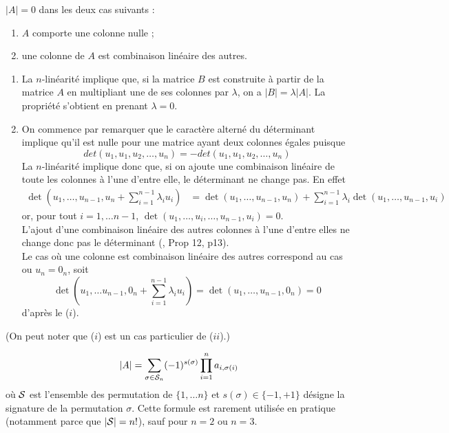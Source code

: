 \begin{lemma} \label{lem:determinantNul}
  $|A| = 0$ dans les deux cas suivants :
  \begin{enumerate}[($i$)] 
  \item $A$ comporte une colonne nulle ;
  \item une colonne de $A$ est combinaison linéaire des autres.
  \end{enumerate}
\end{lemma}

\begin{enumerate}[($i$)]
\item La $n$-linéarité implique que, si la matrice $B$ est construite à partir de la matrice $A$ en multipliant une de ses colonnes par $\lambda$, on a $|B| = \lambda |A|$. La propriété s'obtient en prenant $\lambda = 0$.
\item On commence par remarquer que le caractère alterné du déterminant implique qu'il est nulle pour une matrice ayant deux colonnes égales puisque
$$
det(u_1, u_1, u_2,\dots, u_n) = -det(u_1, u_1, u_2,\dots, u_n)
$$
La $n$-linéarité implique donc que, si on ajoute une combinaison linéaire de toute les colonnes à l'une d'entre elle, le déterminant ne change pas. En effet
\begin{align*}
  \det\left(u_1, \dots, u_{n-1}, u_n + \sum_{i=1}^{n-1} \lambda_i u_i\right)
  & = \det\left(u_1, \dots, u_{n-1}, u_n\right)
  + \sum_{i=1}^{n-1} \lambda_i \det\left(u_1, \dots, u_{n-1}, u_i\right)
\end{align*}
or, pour tout $i = 1, \dots n-1$, $ \det\left(u_1, \dots, u_i, \dots, u_{n-1}, u_i\right) = 0$. \\
L'ajout d'une combinaison linéaire des autres colonnes à l'une d'entre elles ne change donc pas le déterminant (\cite{GAJ94}, Prop 12, p13). \\
Le cas où une colonne est combinaison linéaire des autres correspond au cas ou $u_n = 0_n$, soit
$$
\det\left(u_1, \dots u_{n-1}, 0_n + \sum_{i=1}^{n-1} \lambda_i u_i\right)
= \det\left(u_1, \dots, u_{n-1}, 0_n\right)
= 0
$$
d'après le ($i$).
\end{enumerate}
(On peut noter que ($i$) est un cas particulier de ($ii$).)
\eproof

\begin{proposition} \label{prop:formuleGeneraleDeterminant}
  \begin{equation} \label{eq:determinant}
    |A| = \sum_{\sigma \in \mathcal{S}_n} (-1)^{s(\sigma)} \prod_{i=1}^n a_{i, \sigma(i)} 
    \end{equation}
    où $\mathcal{S}$ est l'ensemble des permutation de $\{1, \dots n\}$ et $s(\sigma) \in \{-1, +1\}$ désigne la signature de la permutation $\sigma$. Cette formule est rarement utilisée en pratique (notamment parce que $|\mathcal{S}| = n!$), sauf pour $n=2$ ou $n=3$.
\end{proposition}


